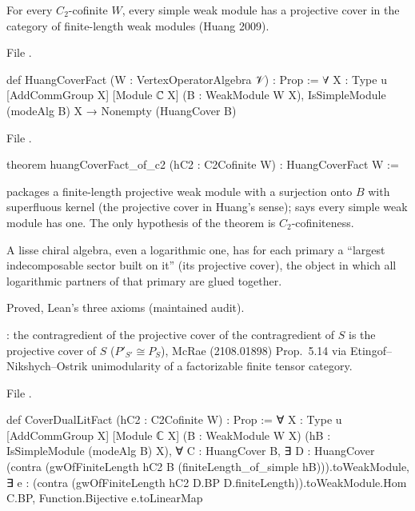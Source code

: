 \begin{theorem}\label{l22:thm:M1}
For every $C_2$-cofinite $W$, every simple weak module has a projective cover in the category of finite-length weak
modules (Huang 2009).
\end{theorem}
\noindent File .
\begin{leancode}
def HuangCoverFact (W : VertexOperatorAlgebra 𝒱) : Prop :=
  ∀ {X : Type u} [AddCommGroup X] [Module ℂ X] (B : WeakModule W X),
    IsSimpleModule (modeAlg B) X → Nonempty (HuangCover B)
\end{leancode}
\noindent File .
\begin{leancode}
theorem huangCoverFact_of_c2 (hC2 : C2Cofinite W) : HuangCoverFact W :=
\end{leancode}

\begin{dictionary}
 packages a finite-length projective weak module with a surjection onto $B$ with superfluous kernel
(the projective cover in Huang's sense);  says every simple weak module has one. The only
hypothesis of the theorem is $C_2$-cofiniteness.
\end{dictionary}

\begin{physics}
A lisse chiral algebra, even a logarithmic one, has for each primary a ``largest indecomposable sector built on it'' (its
projective cover), the object in which all logarithmic partners of that primary are glued together.
\end{physics}

\begin{status}
Proved, Lean's three axioms (maintained audit).
\end{status}

\begin{definition}\label{l22:def:coverdual}
: the contragredient of the projective cover of the contragredient of $S$ is the projective
cover of $S$ ($P'_{S'}\cong P_S$), McRae (2108.01898) Prop.~5.14 via Etingof--Nikshych--Ostrik unimodularity of a
factorizable finite tensor category.
\end{definition}
\noindent File .
\begin{leancode}
def CoverDualLitFact (hC2 : C2Cofinite W) : Prop :=
  ∀ {X : Type u} [AddCommGroup X] [Module ℂ X] (B : WeakModule W X)
    (hB : IsSimpleModule (modeAlg B) X), ∀ C : HuangCover B,
    ∃ D : HuangCover (contra (gwOfFiniteLength hC2 B (finiteLength_of_simple hB))).toWeakModule,
      ∃ e : (contra (gwOfFiniteLength hC2 D.BP D.finiteLength)).toWeakModule.Hom C.BP,
        Function.Bijective e.toLinearMap
\end{leancode}


